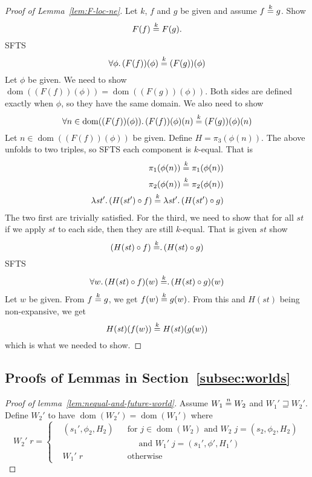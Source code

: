 \documentclass[a4paper]{article}
\newcommand{\nequal}[1][n]{\stackrel{\tiny{#1}}{=}}
\DeclareMathOperator{\dom}{dom}
\newcommand{\var}[1]{\mathit{#1}}
\newcommand{\future}{\mathbin{\sqsupseteq}}
\begin{document}
\begin{appendices}
\begin{proof}[Proof of Lemma~\ref{lem:F-loc-ne}]
Let $k$, $f$ and $g$ be given and assume $f \nequal[k] g$. Show
\[
F(f) \nequal[k] F(g).
\]
SFTS
\[
\forall \phi \ldotp (F(f))(\phi) \nequal[k] (F(g))(\phi)
\]
Let $\phi$ be given. We need to show $\dom((F(f))(\phi)) = \dom((F(g))(\phi))$. Both sides are defined exactly when $\phi$, so they have the same domain. We also need to show
\[
\forall n \in \dom((F(f))(\phi))\ldotp (F(f))(\phi)(n) \nequal[k] (F(g))(\phi)(n)
\]
Let $n \in  \dom((F(f))(\phi))$ be given. Define $H = \pi_3 (\phi(n))$. The above unfolds to two triples, so SFTS each component is $k$-equal. That is
\begin{align*}
  \pi_1(\phi(n)) \nequal[k] \pi_1(\phi(n))\\
  \pi_2(\phi(n)) \nequal[k] \pi_2(\phi(n))\\
  \lambda \var{st}'\ldotp (H(\var{st}') \circ f) \nequal[k]   \lambda \var{st}'\ldotp (H(\var{st}') \circ g)
\end{align*}
The two first are trivially satisfied. For the third, we need to show that for all $\var{st}$ if we apply $\var{st}$ to each side, then they are still $k$-equal. That is given $\var{st}$ show
\[
  (H(\var{st}) \circ f) \nequal[k]   \ldotp (H(\var{st}) \circ g)
\]
SFTS
\[
\forall w \ldotp (H(\var{st}) \circ f)(w) \nequal[k]   \ldotp (H(\var{st}) \circ g)(w)
\]
Let $w$ be given. From $f \nequal[k] g$, we get $f(w) \nequal[k] g(w)$. From this and $H(st)$ being non-expansive, we get
\[
  H(\var{st})(f(w)) \nequal[k]   H(\var{st})(g(w))
\]
which is what we needed to show.

\end{proof}
\subsection{Proofs of Lemmas in Section~\ref{subsec:worlds}}
\begin{proof}[Proof of lemma~\ref{lem:nequal-and-future-world}]
  Assume $W_1 \nequal W_2$ and $W_1' \future W_2'$. Define $W_2'$ to have $\dom(W_2')=\dom(W_1')$ where
\[
  W_2' \; r = \left\{
  \begin{aligned}
    & (s_1',\phi_2,H_2) & &\text{for } j \in \dom(W_2) \text{ and } W_2 \; j = (s_2,\phi_2,H_2) \\
    &                  & &\quad \text{ and } W_1' \; j = (s_1',\phi',H_1') \\
    & W_1' \; r        & &\text{otherwise}
  \end{aligned} 
  \right.
\]


\end{proof}
\end{appendices}
\end{document}
